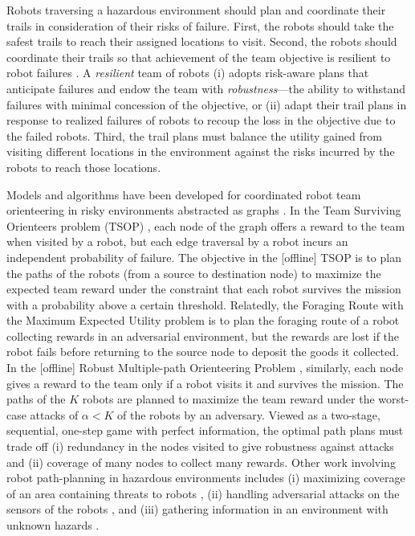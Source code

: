 \documentclass[11pt, oneside]{article}
\begin{document}
Robots traversing a hazardous environment should plan and coordinate their trails in consideration of their risks of failure.
First, the robots should take the safest trails to reach their assigned locations to visit. 
Second, the robots should coordinate their trails so that achievement of the team objective is resilient to robot failures \cite{zhou2021multi}. 
A \emph{resilient} team of robots \cite{prorok2021beyond}
(i)
adopts risk-aware plans that anticipate failures and endow the team with \emph{robustness}---the ability to withstand failures with minimal concession of the objective,
or
(ii) adapt their trail plans in response to realized failures of robots to recoup the loss in the objective due to the failed robots. 
Third, the trail plans must balance the utility gained from visiting different locations in the environment against the risks incurred by the robots to reach those locations.

Models and algorithms have been developed for coordinated robot team orienteering in risky environments abstracted as graphs \cite{zhou2021multi}. 
In the Team Surviving Orienteers problem (TSOP) \cite{jorgensen2018team,jorgensen2017matroid,jorgensen2024matroid}, each node of the graph offers a reward to the team when visited by a robot, but each edge traversal by a robot incurs an independent probability of failure. The objective in the [offline] TSOP is to plan the paths of the robots (from a source to destination node) to maximize the expected team reward under the constraint that each robot survives the mission with a probability above a certain threshold. 
Relatedly, the Foraging Route with the Maximum Expected Utility problem \cite{di2022foraging} is to plan the foraging route of a robot collecting rewards in an adversarial environment, but the rewards are lost if the robot fails before returning to the source node to deposit the goods it collected.
In the [offline] Robust Multiple-path Orienteering Problem \cite{shi2023robust}, similarly, each node gives a reward to the team only if a robot visits it and survives the mission. The paths of the $K$ robots are planned to maximize the team reward under the worst-case attacks of $\alpha<K$ of the robots by an adversary. 
Viewed as a two-stage, sequential, one-step game with perfect information, the optimal path plans must trade off (i) redundancy in the nodes visited to give robustness against attacks and (ii) coverage of many nodes to collect many rewards.
Other work involving robot path-planning in hazardous environments includes 
(i) maximizing coverage of an area containing threats to robots \cite{korngut2023multi,yehoshua2016robotic}, 
(ii) handling adversarial attacks on the sensors of the robots \cite{liu2021distributed,zhou2022distributed,mayya2022adaptive,zhou2018resilient}, and 
(iii) gathering information in an environment with unknown hazards \cite{schwager2017multi}.
\end{document}
